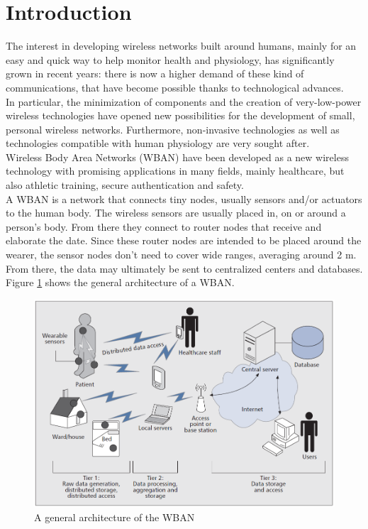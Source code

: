 \documentclass[conference]{IEEEtran}
\begin{document}
\section{Introduction}
The interest in developing wireless networks built around humans, mainly for an easy and quick way to help monitor health and physiology, has significantly grown in recent years: there is now a higher demand of these kind of communications, that have become possible thanks to technological advances.
\\In particular, the minimization of components and the creation of very-low-power wireless technologies have opened new possibilities for the development of small, personal wireless networks. Furthermore, non-invasive technologies as well as technologies compatible with human physiology are very sought after.
\\Wireless Body Area Networks (WBAN) have been developed as a new wireless technology with promising applications in many fields, mainly healthcare, but also athletic training, secure authentication and safety.
\\A WBAN is a network that connects tiny nodes, usually sensors and/or actuators to the human body. The wireless sensors are usually placed in, on or around a person’s body. From there they connect to router nodes that receive and elaborate the date. Since these router nodes are intended to be placed around the wearer, the sensor nodes don’t need to cover wide ranges, averaging around 2 m. From there, the data may ultimately be sent to centralized centers and databases. Figure \ref{fig_WBAN_arch} shows the general architecture of a WBAN.

\begin{figure}[htbp]
\centering
\includegraphics[width=0.9\linewidth]{img/WBAN_arch.png}
\caption{A general architecture of the WBAN}
\label{fig_WBAN_arch}
\end{figure}
\end{document}
